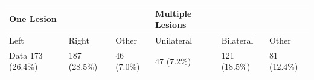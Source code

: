 \begin{table}[htbp]
\centering
\label{tab:table\_001}
\begin{tabular}{llllll}
\hline
One Lesion &  &  & Multiple Lesions &  &  \\
\hline
Left & Right & Other & Unilateral & Bilateral & Other \\
Data 173 (26.4\%) & 187 (28.5\%) & 46 (7.0\%) & 47 (7.2\%) & 121 (18.5\%) & 81 (12.4\%) \\
\hline
\end{tabular}
\end{table}
